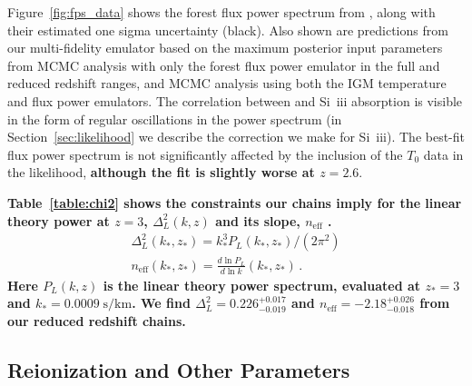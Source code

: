 Figure~\ref{fig:fps_data} shows the \lya forest flux power spectrum from \cite{2019JCAP...07..017C}, along with their estimated one sigma uncertainty (black).
Also shown are predictions from our multi-fidelity emulator based on the maximum posterior input parameters from MCMC analysis with only the \lya forest flux power emulator in the full and reduced redshift ranges, and MCMC analysis using both the IGM temperature and flux power emulators.
The correlation between \lya and Si~{\sc iii} absorption is visible in the form of regular oscillations in the power spectrum (in Section~\ref{sec:likelihood} we describe the correction we make for Si~{\sc iii}).
The best-fit flux power spectrum is not significantly affected by the inclusion of the $T_0$ data in the likelihood, \textbf{although the fit is slightly worse at $z=2.6$}. %

\textbf{Table~\ref{table:chi2} shows the constraints our chains imply for the linear theory power at $z=3$, $\Delta_L^2(k,z)$ and its slope, $n_\mathrm{eff}$ \cite{2005ApJ...635..761M, 2019JCAP...07..017C, 2023ApJ...944..223P}.}
\begin{align}
 \Delta_L^2(k_*, z_*) = k_*^3 P_L(k_*,z_*) / (2\pi^2) \\
 n_\mathrm{eff}(k_*, z_*) = \frac{d \ln P_L}{d \ln k} (k_*, z_*)\,.
\end{align}
\textbf{Here $P_L(k,z)$ is the linear theory power spectrum, evaluated at $z_* = 3$ and $k_* = 0.0009\;\mathrm{s/km}$. We find $\Delta_L^2 = 0.226^{+0.017}_{-0.019}$ and $n_\mathrm{eff} = -2.18^{+0.026}_{-0.018}$ from our reduced redshift chains.}


\subsection{Reionization and Other Parameters}\label{sec:astro}

